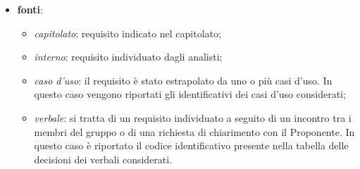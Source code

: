 \begin{itemize}
	\item{\textbf{fonti}}:   
		\begin{itemize}
			\item \textit{capitolato}: requisito indicato nel capitolato; 
			\item \textit{interno}: requisito individuato dagli analisti; 
			\item \textit{caso d'uso}: il requisito è stato estrapolato da uno o più casi d'uso. In questo caso vengono riportati gli identificativi dei casi d'uso considerati; 
			\item \textit{verbale}: si tratta di un requisito individuato a seguito di un incontro tra i membri del gruppo o di una richiesta di chiarimento con il Proponente. 
			In questo caso è riportato il codice identificativo presente nella tabella delle decisioni dei verbali considerati. 
		\end{itemize} 
\end{itemize}
